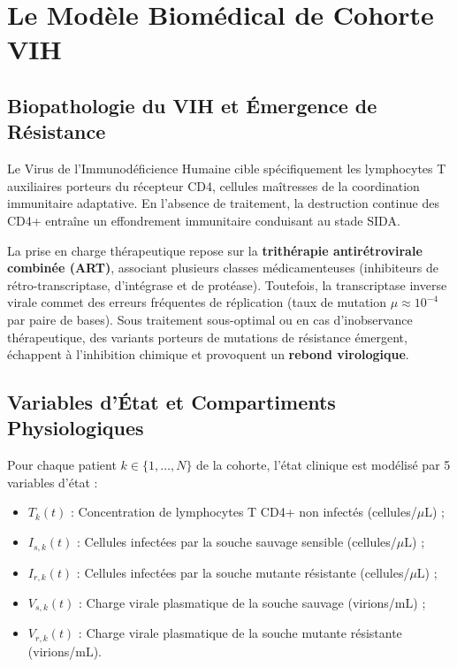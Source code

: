 \documentclass[11pt,a4paper]{report}
\theoremstyle{plain}
\theoremstyle{definition}
\theoremstyle{remark}
\begin{document}
\chapter{Le Modèle Biomédical de Cohorte VIH}

\section{Biopathologie du VIH et Émergence de Résistance}
Le Virus de l'Immunodéficience Humaine cible spécifiquement les lymphocytes T auxiliaires porteurs du récepteur CD4, cellules maîtresses de la coordination immunitaire adaptative. En l'absence de traitement, la destruction continue des CD4+ entraîne un effondrement immunitaire conduisant au stade SIDA.

La prise en charge thérapeutique repose sur la \textbf{trithérapie antirétrovirale combinée (ART)}, associant plusieurs classes médicamenteuses (inhibiteurs de rétro-transcriptase, d'intégrase et de protéase). Toutefois, la transcriptase inverse virale commet des erreurs fréquentes de réplication (taux de mutation $\mu \approx 10^{-4}$ par paire de bases). Sous traitement sous-optimal ou en cas d'inobservance thérapeutique, des variants porteurs de mutations de résistance émergent, échappent à l'inhibition chimique et provoquent un \textbf{rebond virologique}.

\section{Variables d'État et Compartiments Physiologiques}
Pour chaque patient $k \in \{1, \dots, N\}$ de la cohorte, l'état clinique est modélisé par 5 variables d'état :
\begin{itemize}
    \item $T_k(t)$ : Concentration de lymphocytes T CD4+ non infectés (cellules/$\mu\text{L}$) ;
    \item $I_{s,k}(t)$ : Cellules infectées par la souche sauvage sensible (cellules/$\mu\text{L}$) ;
    \item $I_{r,k}(t)$ : Cellules infectées par la souche mutante résistante (cellules/$\mu\text{L}$) ;
    \item $V_{s,k}(t)$ : Charge virale plasmatique de la souche sauvage (virions/$\text{mL}$) ;
    \item $V_{r,k}(t)$ : Charge virale plasmatique de la souche mutante résistante (virions/$\text{mL}$).
\end{itemize}
\end{document}
